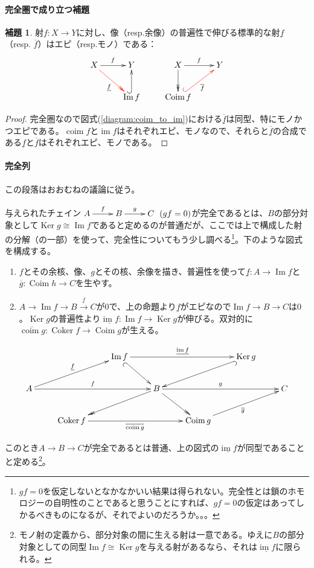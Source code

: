 \documentclass[a4paper,11pt]{jsarticle}
\theoremstyle{definition}
\newtheorem{lem}[thm]{補題}
\DeclareMathOperator{\Ima}{\mathrm{Im}}
\DeclareMathOperator{\im}{\mathrm{im}}
\DeclareMathOperator{\Coker}{\mathrm{Coker}}
\DeclareMathOperator{\Coim}{\mathrm{Coim}}
\DeclareMathOperator{\coim}{\mathrm{coim}}
\DeclareMathOperator{\Ker}{\mathrm{Ker}}
\newcommand{\ou}[1]{\overline{\underline{#1}}}
\begin{document}
\paragraph{完全圏で成り立つ補題}
\begin{lem}
射$f\colon X\to Y$に対し、像（resp.余像）の普遍性で伸びる標準的な射$\underline{f}$（resp. $\overline{f}$）はエピ（resp.モノ）である：\[\xymatrix{
  X\ar[r]^f\ar@[red]@{->>}[rd]_{\underline{f}}&Y&X\ar[r]^{f}\ar@{->>}[d]&Y\\
  &\Ima f\ar@{^(->}[u]&\Coim f\ar@{^(->}@[red][ur]_{\overline{f}}&
}\]
\end{lem}
\begin{proof}
  完全圏なので図式(\ref{diagram:coim_to_im})における$\ou{f}$は同型、特にモノかつエピである。$\coim f$と$\im f$はそれぞれエピ、モノなので、それらと$\ou{f}$の合成である$\underline{f}$と$\overline{f}$はそれぞれエピ、モノである。
\end{proof}
\paragraph{完全列}
この段落はおおむね\cite{kashiwara2005categories}の議論に従う。

与えられたチェイン$\xymatrix{A\ar[r]^f&B\ar[r]^g&C}\ (gf=0)$が完全であるとは、$B$の部分対象として$\Ker g\cong \Ima f$であると定めるのが普通だが、ここでは上で構成した射の分解（の一部）を使って、完全性についてもう少し調べる\footnote{$gf=0$を仮定しないとなかなかいい結果は得られない。完全性とは鎖のホモロジーの自明性のことであると思うことにすれば、$gf=0$の仮定はあってしかるべきものになるが、それでよいのだろうか。。。}。下のような図式を構成する。

\begin{enumerate}[label=\underline{\textsf{Step. \arabic*}}]
  \item $f$とその余核、像、$g$とその核、余像を描き、普遍性を使って$\underline{f}\colon A\to \Ima f$と$\overline{g}\colon \Coim h\to C$を生やす。
  \item $A\to \Ima f\to B\stackrel{\underline{f}}{\to} C$が$0$で、上の命題より$\underline f$がエピなので$\Ima f\to B\to C$は$0$。$\Ker g$の普遍性より$\underline{\im f}\colon\Ima f\to \Ker g$が伸びる。双対的に$\overline{\coim g}\colon\Coker f\to \Coim g$が生える。
\end{enumerate}
\[
\xymatrix{
&&\Ima f\ar@{_(->}[rd]\ar[rrr]^{\underline{\im f}}&&&\Ker g\ar@{^(->}[lld]&\\
A\ar[rrr]^{f}\ar[urr]^{\underline{f}}&&&B\ar[rrr]^{g}\ar@{->>}[lld]\ar@{->>}[rd]&&&C\\
&\Coker f\ar[rrr]_{\overline{\coim g}}&&&\Coim g\ar[urr]_{\overline{g}}&&
}
\]

このとき$A\to B\to C$が完全であるとは普通、上の図式の$\underline{\im f}$が同型であることと定める\footnote{モノ射の定義から、部分対象の間に生える射は一意である。ゆえに$B$の部分対象としての同型$\Ima f\cong \Ker g$を与える射があるなら、それは$\underline{\im f}$に限られる。}。



\end{document}
